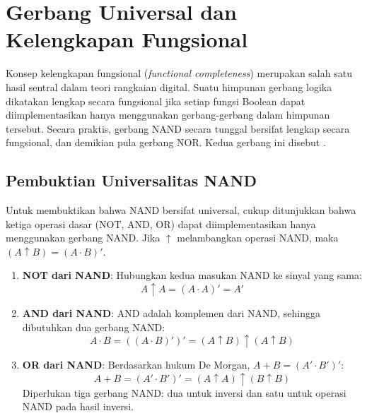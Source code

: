 \section{Gerbang Universal dan Kelengkapan Fungsional}

Konsep kelengkapan fungsional (\textit{functional completeness}) merupakan salah satu hasil sentral dalam teori rangkaian digital. Suatu himpunan gerbang logika dikatakan lengkap secara fungsional jika setiap fungsi Boolean dapat diimplementasikan hanya menggunakan gerbang-gerbang dalam himpunan tersebut. Secara praktis, gerbang NAND secara tunggal bersifat lengkap secara fungsional, dan demikian pula gerbang NOR. Kedua gerbang ini disebut  \cite{rosen2019}.

\subsection{Pembuktian Universalitas NAND}

Untuk membuktikan bahwa NAND bersifat universal, cukup ditunjukkan bahwa ketiga operasi dasar (NOT, AND, OR) dapat diimplementasikan hanya menggunakan gerbang NAND. Jika $\uparrow$ melambangkan operasi NAND, maka $(A \uparrow B) = (A \cdot B)'$.

\begin{enumerate}[label=\textbf{\arabic*.}]
  \item \textbf{NOT dari NAND}: Hubungkan kedua masukan NAND ke sinyal yang sama:
  \[ A \uparrow A = (A \cdot A)' = A' \]

  \item \textbf{AND dari NAND}: AND adalah komplemen dari NAND, sehingga dibutuhkan dua gerbang NAND:
  \[ A \cdot B = ((A \cdot B)')' = (A \uparrow B) \uparrow (A \uparrow B) \]

  \item \textbf{OR dari NAND}: Berdasarkan hukum De Morgan, $A + B = (A' \cdot B')'$:
  \[ A + B = (A' \cdot B')' = (A \uparrow A) \uparrow (B \uparrow B) \]
  Diperlukan tiga gerbang NAND: dua untuk inversi dan satu untuk operasi NAND pada hasil inversi.
\end{enumerate}

